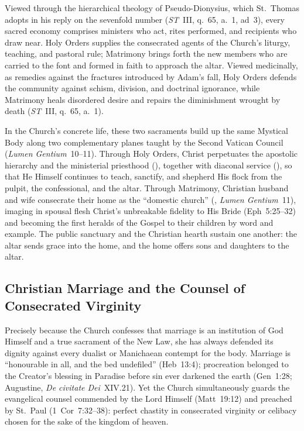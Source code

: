 Viewed through the hierarchical theology of Pseudo-Dionysius, which St.~Thomas adopts in his reply on the sevenfold number (\emph{ST}~III, q.~65, a.~1, ad~3), every sacred economy comprises ministers who act, rites performed, and recipients who draw near. Holy Orders supplies the consecrated agents of the Church's liturgy, teaching, and pastoral rule; Matrimony brings forth the new members who are carried to the font and formed in faith to approach the altar. Viewed medicinally, as remedies against the fractures introduced by Adam's fall, Holy Orders defends the community against schism, division, and doctrinal ignorance, while Matrimony heals disordered desire and repairs the diminishment wrought by death (\emph{ST}~III, q.~65, a.~1).

In the Church's concrete life, these two sacraments build up the same Mystical Body along two complementary planes taught by the Second Vatican Council (\emph{Lumen Gentium}~10--11). Through Holy Orders, Christ perpetuates the apostolic hierarchy and the ministerial priesthood (), together with diaconal service (), so that He Himself continues to teach, sanctify, and shepherd His flock from the pulpit, the confessional, and the altar. Through Matrimony, Christian husband and wife consecrate their home as the ``domestic church'' (, \emph{Lumen Gentium}~11), imaging in spousal flesh Christ's unbreakable fidelity to His Bride (Eph~5:25--32) and becoming the first heralds of the Gospel to their children by word and example. The public sanctuary and the Christian hearth sustain one another: the altar sends grace into the home, and the home offers sons and daughters to the altar.

\subsection{Christian Marriage and the Counsel of Consecrated Virginity}
\label{subsec:marriage-and-virginity}

Precisely because the Church confesses that marriage is an institution of God Himself and a true sacrament of the New Law, she has always defended its dignity against every dualist or Manichaean contempt for the body. Marriage is ``honourable in all, and the bed undefiled'' (Heb~13:4); procreation belonged to the Creator's blessing in Paradise before sin ever darkened the earth (Gen~1:28; Augustine, \emph{De civitate Dei}~XIV.21). Yet the Church simultaneously guards the evangelical counsel commended by the Lord Himself (Matt~19:12) and preached by St.~Paul (1~Cor~7:32--38): perfect chastity in consecrated virginity or celibacy chosen for the sake of the kingdom of heaven.

